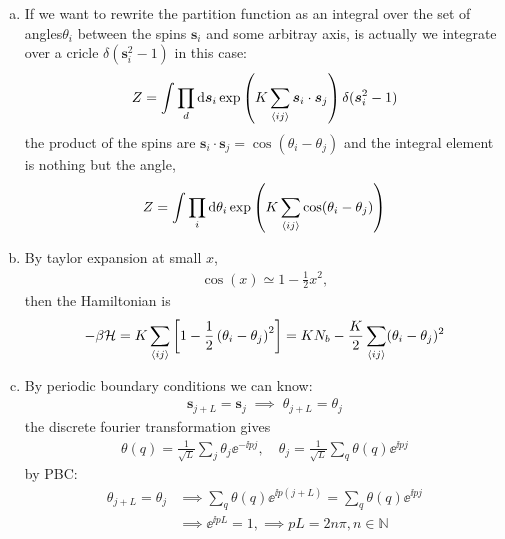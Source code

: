 \begin{solution}
    \begin{enumerate}[(a)]
        \item If we want to rewrite the partition function as an integral over the set of angles$\theta_i$ between the spins $\bm s_i$ and some arbitray axis, is actually we integrate over a cricle $\delta(\bm s_i^2 - 1)$ in this case:
        \begin{align*}
            Z = \int \prod_d \mathrm{d} \bm s_i \exp \left( K \sum_{\left\langle ij \right\rangle}\bm s_i \cdot \bm s_j \right) \delta(\bm s_i^2-1)
        \end{align*}
        the product of the spins are $\bm s_i \cdot \bm s_j = \cos (\theta_i - \theta_j)$ and the integral element is nothing but the angle, 
        \begin{align*}
            Z = \int \prod_i \mathrm{d} \theta_i \exp \left(K \sum_{\left\langle ij \right\rangle} \cos (\theta_i - \theta_j)\right)
        \end{align*}
        \item By taylor expansion at small $x$, 
        \begin{align*}
            \cos(x) \simeq 1 - \frac{1}{2} x^2,
        \end{align*}
        then the Hamiltonian is 
        \begin{align*}
           - \beta \mathcal{H} = K \sum_{\left\langle ij \right\rangle} \left[ 1 - \frac{1}{2} \left(\theta_i - \theta_j\right)^2 \right] = K N_b - \frac{K}{2} \sum_{\left\langle ij \right\rangle} (\theta_i - \theta_j)^2
        \end{align*}
        \item By periodic boundary conditions we can know: 
        \begin{align*}
            \bm{s}_{j+L} = \bm{s}_j \;\implies \; \theta_{j + L} = \theta_j
        \end{align*}
        the discrete fourier transformation gives 
        \begin{align*}
            \theta(q) = \frac{1}{\sqrt{L}} \sum_j \theta_j \ee^{- \ii pj}, \quad \theta_j = \frac{1}{\sqrt{L}} \sum_q \theta(q) \ee^{\ii pj}
        \end{align*}
        by PBC: 
        \begin{align*}
            \theta_{j + L} = \theta_j &\implies \sum_q \theta(q) \ee^{\ii p (j+L)} = \sum_q \theta(q) \ee^{\ii p j} \\
            &\implies \ee^{\ii p L} = 1, \implies pL = 2 n \pi, n \in \mathbb{N}
        \end{align*}

\end{enumerate}
\end{solution}
